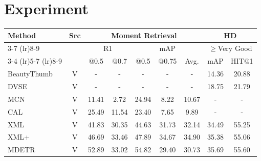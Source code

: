 \section{Experiment}
\begin{table*}[!ht]
    \centering
    \begin{tabular}{lcccccccc}
        \toprule  %

    \multirow{4}{*}{\textbf{Method}} & \multirow{4}{*}{\textbf{Src}} & \multicolumn{5}{c}{\textbf{Moment Retrieval}}                           & \multicolumn{2}{c}{\textbf{HD}}                       \\ \cmidrule(r){3-7} \cmidrule(lr){8-9}
                            &                      & \multicolumn{2}{c}{R1} & \multicolumn{3}{c}{mAP} & \multicolumn{2}{c}{$\ge$Very Good} \\ \cmidrule(r){3-4} \cmidrule(lr){5-7} \cmidrule(lr){8-9}
                            &                      & @0.5       & @0.7      & @0.5   & @0.75  & Avg.  & mAP                   & HIT@1                \\
     \midrule
    BeautyThumb~\cite{DBLP:conf/cikm/SongRVJ16}      & V                    & -          & -         & -      & -      & -     & 14.36                 & 20.88                \\
    DVSE~\cite{DBLP:conf/cvpr/LiuMZCL15}            & V                    & -          & -         & -      & -      & -     & 18.75                 & 21.79                \\
    MCN~\cite{DBLP:conf/emnlp/HendricksWSSDR18}             & V                    & 11.41      & 2.72      & 24.94  & 8.22   & 10.67 & -                     & -                    \\
    CAL~\cite{DBLP:journals/corr/abs-1907-12763}             & V                    & 25.49      & 11.54     & 23.40   & 7.65   & 9.89  & -                     & -                    \\
    XML~\cite{DBLP:conf/eccv/LeiYBB20}            & V                    & 41.83      & 30.35     & 44.63  & 31.73  & 32.14 & 34.49                 & 55.25                \\
    XML+~\cite{lei2021detecting}            & V                    & 46.69      & 33.46     & 47.89  & 34.67  & 34.90  & 35.38                 & 55.06                \\
    MDETR~\cite{lei2021detecting}          & V                    & 52.89      & 33.02     & 54.82  & 29.40   & 30.73 & 35.69                 & 55.60                 \\

\end{tabular}
\end{table*}
